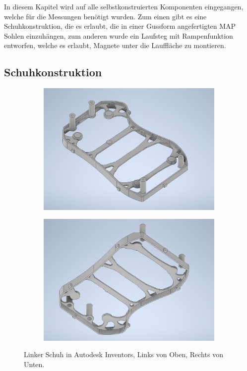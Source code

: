 In diesem Kapitel wird auf alle selbstkonstruierten Komponenten eingegangen, welche für die Messungen benötigt wurden. Zum einen gibt es eine Schuhkonstruktion, die es erlaubt, die in einer Gussform angefertigten MAP Sohlen einzuhängen, zum anderen wurde ein Laufsteg mit Rampenfunktion entworfen, welche es erlaubt, Magnete unter die Lauffläche zu montieren. 

\subsection{Schuhkonstruktion} \label{Schuhkonstruktion}
\begin{figure}[tb]
	\hfill
	\begin{subfigure}[c]{.49\linewidth}
		\centering
		\includegraphics[width=\linewidth]{Bilder/Schuh_oben.png}
	\end{subfigure}
	\begin{subfigure}[c]{.49\linewidth}
		\centering
		\includegraphics[width=\linewidth]{Bilder/Schuh_unten.png}
	\end{subfigure}
	\hfill
	\caption{Linker Schuh in Autodesk Inventors, Links von Oben, Rechts von Unten.}
	\label{Schuh_Inventor}
\end{figure}

